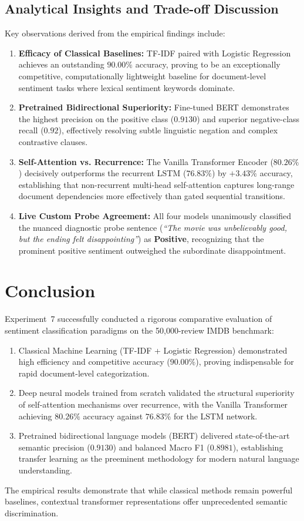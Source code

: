 \documentclass[12pt,a4paper]{report}
\begin{document}
\subsection{Analytical Insights and Trade-off Discussion}
Key observations derived from the empirical findings include:
\begin{enumerate}
    \item \textbf{Efficacy of Classical Baselines:} TF-IDF paired with Logistic Regression achieves an outstanding $90.00\%$ accuracy, proving to be an exceptionally competitive, computationally lightweight baseline for document-level sentiment tasks where lexical sentiment keywords dominate.
    \item \textbf{Pretrained Bidirectional Superiority:} Fine-tuned BERT demonstrates the highest precision on the positive class ($0.9130$) and superior negative-class recall ($0.92$), effectively resolving subtle linguistic negation and complex contrastive clauses.
    \item \textbf{Self-Attention vs. Recurrence:} The Vanilla Transformer Encoder ($80.26\%$) decisively outperforms the recurrent LSTM ($76.83\%$) by $+3.43\%$ accuracy, establishing that non-recurrent multi-head self-attention captures long-range document dependencies more effectively than gated sequential transitions.
    \item \textbf{Live Custom Probe Agreement:} All four models unanimously classified the nuanced diagnostic probe sentence (\textit{``The movie was unbelievably good, but the ending felt disappointing''}) as \textbf{Positive}, recognizing that the prominent positive sentiment outweighed the subordinate disappointment.
\end{enumerate}

\section{Conclusion}
Experiment~7 successfully conducted a rigorous comparative evaluation of sentiment classification paradigms on the 50,000-review IMDB benchmark:
\begin{enumerate}
    \item Classical Machine Learning (TF-IDF + Logistic Regression) demonstrated high efficiency and competitive accuracy ($90.00\%$), proving indispensable for rapid document-level categorization.
    \item Deep neural models trained from scratch validated the structural superiority of self-attention mechanisms over recurrence, with the Vanilla Transformer achieving $80.26\%$ accuracy against $76.83\%$ for the LSTM network.
    \item Pretrained bidirectional language models (BERT) delivered state-of-the-art semantic precision ($0.9130$) and balanced Macro F1 ($0.8981$), establishing transfer learning as the preeminent methodology for modern natural language understanding.
\end{enumerate}
The empirical results demonstrate that while classical methods remain powerful baselines, contextual transformer representations offer unprecedented semantic discrimination.
\end{document}
